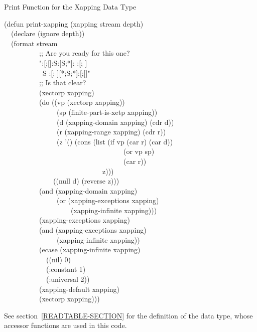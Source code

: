 {\newpage
\clearpage
\samepage \begin{table}%
[t]
\caption{Print Function for the Xapping Data Type}
\label{XAPPING-FORMAT-TABLE}
\begingroup
\small
\begin{lisp}
(defun print-xapping (xapping stream depth) \\ 
~~(declare (ignore depth)) \\ 
~~(format stream \\ 
~~~~~~~~~~;; Are you ready for this one? \\ 
~~~~~~~~~~"{\Xtilde}:[{\Xlbrace}{\Xtilde};[{\Xtilde}]{\Xtilde}:{\Xlbrace}{\Xtilde}S{\Xtilde}:[{\Xarrowright}{\Xtilde}S{\Xtilde};{\Xtilde}*{\Xtilde}]{\Xtilde}:{\Xcircumflex} {\Xtilde}{\Xrbrace}{\Xtilde}:[{\Xtilde}; {\Xtilde}]{\Xtilde} \\ 
~~~~~~~~~~~{\Xtilde}{\Xlbrace}{\Xtilde}S{\Xarrowright}{\Xtilde}{\Xcircumflex} {\Xtilde}{\Xrbrace}{\Xtilde}:[{\Xtilde}; {\Xtilde}]{\Xtilde}[{\Xtilde}*{\Xtilde};{\Xarrowright}{\Xtilde}S{\Xtilde};{\Xarrowright}{\Xtilde}*{\Xtilde}]{\Xtilde}:[{\Xrbrace}{\Xtilde};]{\Xtilde}]" \\ 
~~~~~~~~~~;; Is that clear? \\ 
~~~~~~~~~~(xectorp xapping) \\ 
~~~~~~~~~~(do ((vp (xectorp xapping)) \\ 
~~~~~~~~~~~~~~~(sp (finite-part-is-xetp xapping)) \\ 
~~~~~~~~~~~~~~~(d (xapping-domain xapping) (cdr d)) \\ 
~~~~~~~~~~~~~~~(r (xapping-range xapping) (cdr r)) \\ 
~~~~~~~~~~~~~~~(z '() (cons (list (if vp (car r) (car d)) \\ 
~~~~~~~~~~~~~~~~~~~~~~~~~~~~~~~~~~(or vp sp) \\ 
~~~~~~~~~~~~~~~~~~~~~~~~~~~~~~~~~~(car r)) \\ 
~~~~~~~~~~~~~~~~~~~~~~~~~~~~z))) \\ 
~~~~~~~~~~~~~~((null d) (reverse z))) \\ 
~~~~~~~~~~(and (xapping-domain xapping) \\ 
~~~~~~~~~~~~~~~(or (xapping-exceptions xapping) \\ 
~~~~~~~~~~~~~~~~~~~(xapping-infinite xapping))) \\ 
~~~~~~~~~~(xapping-exceptions xapping) \\ 
~~~~~~~~~~(and (xapping-exceptions xapping) \\ 
~~~~~~~~~~~~~~~(xapping-infinite xapping)) \\ 
~~~~~~~~~~(ecase (xapping-infinite xapping) \\ 
~~~~~~~~~~~~((nil) 0) \\ 
~~~~~~~~~~~~(:constant 1) \\ 
~~~~~~~~~~~~(:universal 2)) \\ 
~~~~~~~~~~(xapping-default xapping) \\ 
~~~~~~~~~~(xectorp xapping)))
\end{lisp}
\endgroup
See section~\ref{READTABLE-SECTION} for the  definition of the  data
type, whose accessor functions are used in this code.
\end{table}
}


